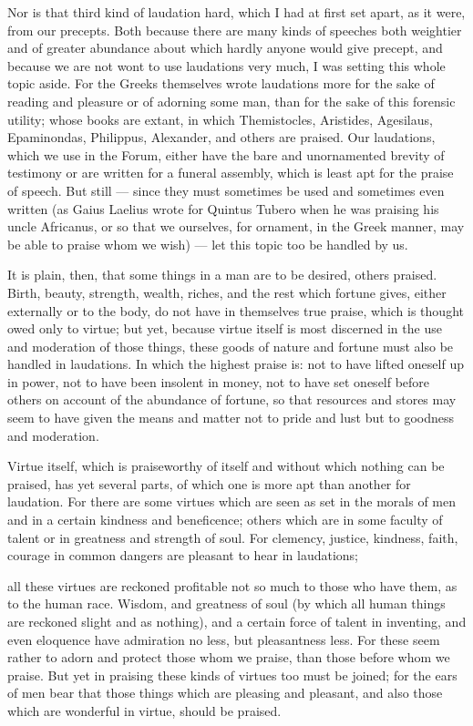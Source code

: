  Nor is that third kind of laudation hard, which I had at first set apart, as it were, from our precepts. Both because there are many kinds of speeches both weightier and of greater abundance about which hardly anyone would give precept, and because we are not wont to use laudations very much, I was setting this whole topic aside. For the Greeks themselves wrote laudations more for the sake of reading and pleasure or of adorning some man, than for the sake of this forensic utility; whose books are extant, in which Themistocles, Aristides, Agesilaus, Epaminondas, Philippus, Alexander, and others are praised. Our laudations, which we use in the Forum, either have the bare and unornamented brevity of testimony or are written for a funeral assembly, which is least apt for the praise of speech. But still — since they must sometimes be used and sometimes even written (as Gaius Laelius wrote for Quintus Tubero when he was praising his uncle Africanus, or so that we ourselves, for ornament, in the Greek manner, may be able to praise whom we wish) — let this topic too be handled by us.

 It is plain, then, that some things in a man are to be desired, others praised. Birth, beauty, strength, wealth, riches, and the rest which fortune gives, either externally or to the body, do not have in themselves true praise, which is thought owed only to virtue; but yet, because virtue itself is most discerned in the use and moderation of those things, these goods of nature and fortune must also be handled in laudations. In which the highest praise is: not to have lifted oneself up in power, not to have been insolent in money, not to have set oneself before others on account of the abundance of fortune, so that resources and stores may seem to have given the means and matter not to pride and lust but to goodness and moderation.

 Virtue itself, which is praiseworthy of itself and without which nothing can be praised, has yet several parts, of which one is more apt than another for laudation. For there are some virtues which are seen as set in the morals of men and in a certain kindness and beneficence; others which are in some faculty of talent or in greatness and strength of soul. For clemency, justice, kindness, faith, courage in common dangers are pleasant to hear in laudations;

 all these virtues are reckoned profitable not so much to those who have them, as to the human race. Wisdom, and greatness of soul (by which all human things are reckoned slight and as nothing), and a certain force of talent in inventing, and even eloquence have admiration no less, but pleasantness less. For these seem rather to adorn and protect those whom we praise, than those before whom we praise. But yet in praising these kinds of virtues too must be joined; for the ears of men bear that those things which are pleasing and pleasant, and also those which are wonderful in virtue, should be praised.

